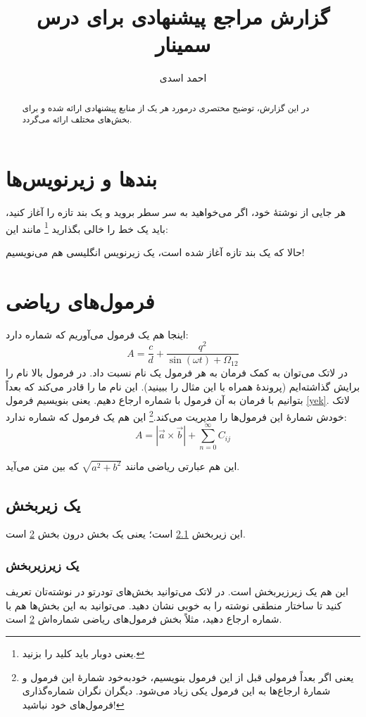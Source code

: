 \documentclass{article}
\title{گزارش  مراجع پیشنهادی برای درس سمینار}
\author{احمد اسدی}
\begin{document}
\maketitle

\begin{abstract}
در این گزارش‌، توضیح مختصری درمورد هر یک از منابع پیشنهادی ارائه شده و برای بخش‌های مختلف ارائه می‌گردد.
\end{abstract}
\section{بندها و زیرنویس‌ها}
هر جایی از نوشتهٔ خود، اگر می‌خواهید به سر سطر بروید و یک بند تازه را آغاز کنید، باید یک خط را خالی بگذارید
\footnote{یعنی دوبار باید کلید  را بزنید.}
 مانند این:

حالا که یک بند تازه آغاز شده است، یک زیرنویس انگلیسی
 هم می‌نویسیم!
\section{فرمول‌های ریاضی}\label{formula}

اینجا هم یک فرمول می‌آوریم که شماره دارد:
\begin{equation}\label{yek}
A=\frac{c}{d}+\frac{q^2}{\sin(\omega t)+\Omega_{12}}
\end{equation}
در لاتک می‌توان به کمک فرمان 
به هر فرمول یک نام نسبت داد. در فرمول بالا نام  را برایش گذاشته‌ایم (پروندهٔ  همراه با این مثال را ببینید). این نام ما را قادر می‌کند که بعداً بتوانیم با فرمان
به آن فرمول با شماره ارجاع دهیم. یعنی بنویسیم فرمول \ref{yek}. 
لاتک خودش شمارهٔ این فرمول‌ها را مدیریت می‌کند.\footnote{یعنی اگر بعداً فرمولی قبل از این فرمول بنویسیم، خودبه‌خود شمارهٔ این فرمول و شمارهٔ ارجاع‌ها به این فرمول یکی زیاد می‌شود. دیگران نگران شماره‌گذاری فرمول‌های خود نباشید!} این هم یک فرمول که شماره ندارد:
$$A=|\vec{a}\times \vec{b}| + \sum_{n=0}^\infty C_{ij}$$

این هم عبارتی ریاضی مانند 
$\sqrt{a^2+b^2}$
 که بین متن می‌آید.
\subsection{یک زیربخش}\label{zirbakhsh}

این زیربخش \ref{zirbakhsh} است؛ یعنی یک بخش درون بخش \ref{formula} است.
\subsubsection{یک زیرزیربخش}
این هم یک زیرزیربخش است. در لاتک می‌توانید بخش‌های تودرتو در نوشته‌تان تعریف کنید تا ساختار منطقی نوشته را به خوبی نشان دهید. می‌توانید به این بخش‌ها هم با شماره ارجاع دهید، مثلاً بخش فرمول‌های ریاضی شماره‌اش \ref{formula} است.
\end{document}

